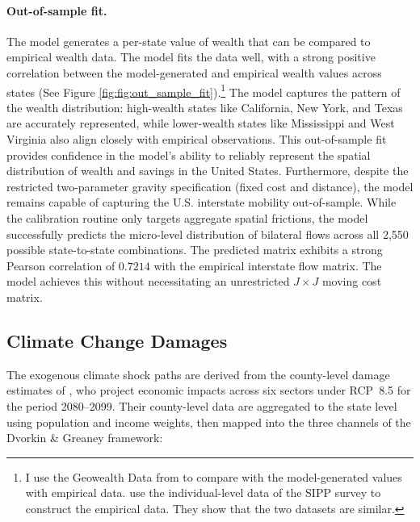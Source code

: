 \documentclass[12pt, a4paper]{article}
\begin{document}
\paragraph{Out-of-sample fit.} The model generates a per-state value of wealth that can be compared to empirical wealth data. The model fits the data well, with a strong positive correlation between the model-generated and empirical wealth values across states (See Figure \ref{fig:fig:out_sample_fit}).\footnote{I use the Geowealth Data from \cite{suss_geowealth-us_2024} to compare with the model-generated values with empirical data. \cite{dvorkin_geography_2025} use the individual-level data of the SIPP survey to construct the empirical data. They show that the two datasets are similar.} The model captures the pattern of the wealth distribution: high-wealth states like California, New York, and Texas are accurately represented, while lower-wealth states like Mississippi and West Virginia also align closely with empirical observations. This out-of-sample fit provides confidence in the model's ability to reliably represent the spatial distribution of wealth and savings in the United States. Furthermore, despite the restricted two-parameter gravity specification (fixed cost and distance), the model remains capable of capturing the U.S. interstate mobility out-of-sample. While the calibration routine only targets aggregate spatial frictions, the model successfully predicts the micro-level distribution of bilateral flows across all 2,550 possible state-to-state combinations. The predicted matrix exhibits a strong Pearson correlation of $0.7214$ with the empirical interstate flow matrix. The model achieves this without necessitating an unrestricted $J \times J$ moving cost matrix.



\subsection{Climate Change Damages}
The exogenous climate shock paths are derived from the county-level damage estimates of \citet{hsiang_estimating_2017}, who project economic impacts across six sectors under RCP~8.5 for the period 2080--2099. Their county-level data are aggregated to the state level using population and income weights, then mapped into the three channels of the Dvorkin \& Greaney framework:

\end{document}
